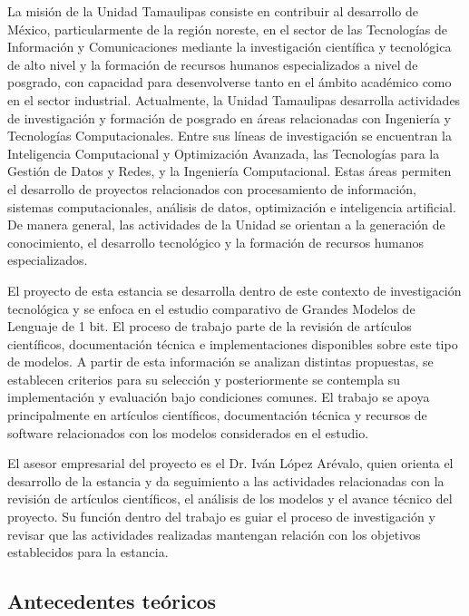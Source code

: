 La misión de la Unidad Tamaulipas consiste en contribuir al desarrollo de México, particularmente de la región noreste, en el sector de las Tecnologías de Información y Comunicaciones mediante la investigación científica y tecnológica de alto nivel y la formación de recursos humanos especializados a nivel de posgrado, con capacidad para desenvolverse tanto en el ámbito académico como en el sector industrial.
Actualmente, la Unidad Tamaulipas desarrolla actividades de investigación y formación de posgrado en áreas relacionadas con Ingeniería y Tecnologías Computacionales. Entre sus líneas de investigación se encuentran la Inteligencia Computacional y Optimización Avanzada, las Tecnologías para la Gestión de Datos y Redes, y la Ingeniería Computacional. Estas áreas permiten el desarrollo de proyectos relacionados con procesamiento de información, sistemas computacionales, análisis de datos, optimización e inteligencia artificial. De manera general, las actividades de la Unidad se orientan a la generación de conocimiento, el desarrollo tecnológico y la formación de recursos humanos especializados.

El proyecto de esta estancia se desarrolla dentro de este contexto de investigación tecnológica y se enfoca en el estudio comparativo de Grandes Modelos de Lenguaje de 1 bit. El proceso de trabajo parte de la revisión de artículos científicos, documentación técnica e implementaciones disponibles sobre este tipo de modelos. A partir de esta información se analizan distintas propuestas, se establecen criterios para su selección y posteriormente se contempla su implementación y evaluación bajo condiciones comunes. El trabajo se apoya principalmente en artículos científicos, documentación técnica y recursos de software relacionados con los modelos considerados en el estudio.

El asesor empresarial del proyecto es el Dr. Iván López Arévalo, quien orienta el desarrollo de la estancia y da seguimiento a las actividades relacionadas con la revisión de artículos científicos, el análisis de los modelos y el avance técnico del proyecto. Su función dentro del trabajo es guiar el proceso de investigación y revisar que las actividades realizadas mantengan relación con los objetivos establecidos para la estancia.

\subsection{Antecedentes teóricos} \label{sec:antecedentes_teoricos} %

